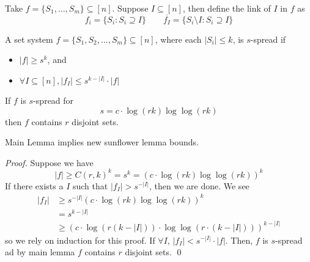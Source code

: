 \begin{definition}
	Take $f = \{ S_1, \dots, S_m \} \subseteq [n]$. Suppose $I \subseteq [n]$, then define the link of $I$ in $f$ as 
	\begin{equation}
		f_i = \{ S_i : S_i \supseteq I \} \quad \quad \overline {f_I} = \{ S_i \setminus I : S_i \supseteq I \}
	\end{equation}
\end{definition}

\begin{definition}
	[Spread]
	A set system $f = \{ S_1, S_2, \dots, S_m \} \subseteq [n]$, where each $|S_i| \leq k$, is $s$-spread if 
	\begin{itemize}
		\item $|f| \geq s^k$, and 
		\item $\forall I \subseteq [n], |f_I| \leq s^{k - |I|} \cdot |f|$
	\end{itemize}
\end{definition}

\begin{lemma}
	If $f$ is $s$-spread for 
	\begin{equation}
		s = c \cdot \log ( r k ) \log \log (r k)
	\end{equation}
	then $f$ contains $r$ disjoint sets. 
\end{lemma}

\begin{proposition}
	Main Lemma implies new sunflower lemma bounds. 	
\end{proposition}

\begin{proof}
	Suppose we have 
	\begin{equation}
		|f| \geq C(r, k)^k = s^k = (c \cdot \log ( r k ) \log \log (r k)) ^k
	\end{equation}
	If there exists a $I$ such that $|f_I| > s^{-|I|}$, then we are done. We see
	\begin{align}
		|f_I| 
		&\geq s^{-|I|} (c \cdot \log ( r k ) \log \log (r k))^k \\
		&= s^{k - |I|} \\
		&\geq \left( 
			c \cdot \log (r (k - |I|)) \cdot \log \log (r \cdot (k - |I|))
		\right)^{k - |I|}
	\end{align}
	so we rely on induction for this proof. If $\forall I$, $|f_I| < s^{- |I|} \cdot |f|$. Then, $f$ is $s$-spread ad by main lemma $f$ contains $r$ disjoint sets. \qed
\end{proof}

